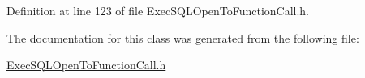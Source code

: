 Definition at line 123 of file Exec\+S\+Q\+L\+Open\+To\+Function\+Call.\+h.



The documentation for this class was generated from the following file\+:\begin{DoxyCompactItemize}
\item 
\hyperlink{_exec_s_q_l_open_to_function_call_8h}{Exec\+S\+Q\+L\+Open\+To\+Function\+Call.\+h}\end{DoxyCompactItemize}
